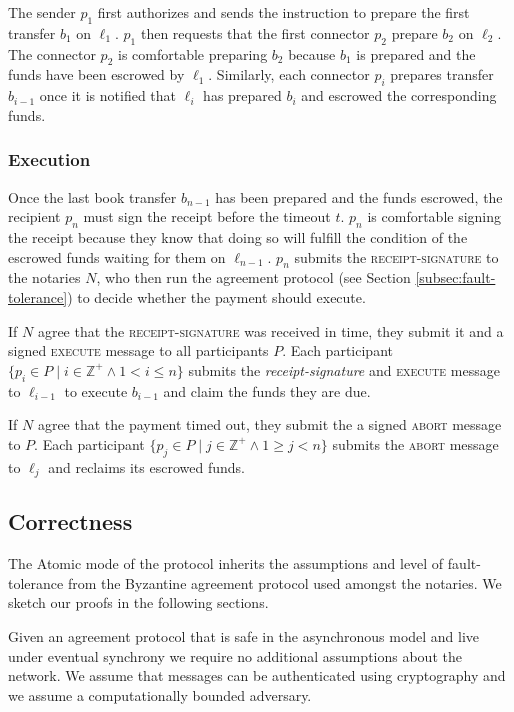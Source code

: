 \documentclass[letterpaper,twocolumn,10pt]{article}
\begin{document}
The sender $p_1$ first authorizes and sends the instruction to prepare the first transfer $b_1$ on $\ell_1$. $p_1$ then requests that the first connector $p_2$ prepare $b_2$ on $\ell_2$. The connector $p_2$ is comfortable preparing $b_2$ because $b_1$ is prepared and the funds have been escrowed by $\ell_1$. Similarly, each connector $p_i$ prepares transfer $b_{i-1}$ once it is notified that $\ell_i$ has prepared $b_i$ and escrowed the corresponding funds.

\subsubsection{Execution}

Once the last book transfer $b_{n-1}$ has been prepared and the funds escrowed, the recipient $p_n$ must sign the receipt before the timeout $t$. $p_n$ is comfortable signing the receipt because they know that doing so will fulfill the condition of the escrowed funds waiting for them on $\ell_{n-1}$. $p_n$ submits the \textsc{receipt-signature} to the notaries $N$, who then run the agreement protocol (see Section \ref{subsec:fault-tolerance}) to decide whether the payment should execute.

If $N$ agree that the \textsc{receipt-signature} was received in time, they submit it and a signed \textsc{execute} message to all participants $P$. Each participant $ \{ p_i \in P \mid i \in \mathbb{Z}^+ \land 1 < i \leq n \} $ submits the \textit{receipt-signature} and \textsc{execute} message to $\ell_{i-1}$ to execute $b_{i-1}$ and claim the funds they are due.

If $N$ agree that the payment timed out, they submit the a signed \textsc{abort} message to $P$. Each participant $ \{ p_j \in P \mid j \in \mathbb{Z}^+ \land 1 \geq j < n \} $ submits the \textsc{abort} message to $\ell_j$ and reclaims its escrowed funds. 

\subsection{Correctness}

The Atomic mode of the protocol inherits the assumptions and level of fault-tolerance from the Byzantine agreement protocol used amongst the notaries. We sketch our proofs in the following sections.

Given an agreement protocol that is safe in the asynchronous model and live under eventual synchrony we require no additional assumptions about the network. We assume that messages can be authenticated using cryptography and we assume a computationally bounded adversary.
\end{document}
